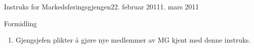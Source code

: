 \begin{instruks}{Instruks for Markedsføringsgjengen}{22. februar 2011}{1. mars 2011 }
    \begin{instruksledd}{Formidling}
        \begin{enumerate}
            \item Gjengsjefen plikter å gjøre nye medlemmer av MG kjent med denne instruks.
        \end{enumerate}
    \end{instruksledd}


\end{instruks}

